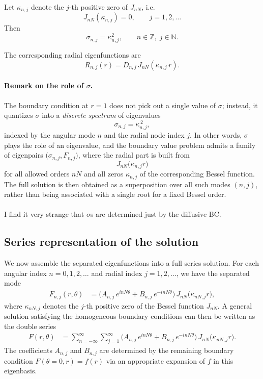 \documentclass{article}
\begin{document}
Let \(\kappa_{n,j}\) denote the \(j\)-th positive zero of \(J_{nN}\), i.e.
\[
J_{nN}(\kappa_{n,j}) = 0,
\qquad j = 1,2,\dots
\]
Then
\begin{equation}
\sigma_{n,j} = \kappa_{n,j}^2,
\qquad n \in \mathbb{Z},\; j \in \mathbb{N}.
\label{eq:eigenvalues}
\end{equation}

The corresponding radial eigenfunctions are
\begin{equation}
R_{n,j}(r)
= D_{n,j}\,J_{nN}\!\left(\kappa_{n,j}\,r\right).
\label{eq:final-radial-modes}
\end{equation}



\paragraph{Remark on the role of \(\sigma\).}
The boundary condition at \(r=1\) does not pick out a single value of \(\sigma\); instead, it quantizes \(\sigma\) into a \emph{discrete spectrum} of eigenvalues
\[
\sigma_{n,j} = \kappa_{n,j}^{\,2},
\]
indexed by the angular mode \(n\) and the radial node index \(j\). In other words, \(\sigma\) plays the role of an eigenvalue, and the boundary value problem admits a family of eigenpairs \(\bigl(\sigma_{n,j}, F_{n,j}\bigr)\), where the radial part is built from
\[
J_{nN}\bigl(\kappa_{n,j} r\bigr)
\]
for all allowed orders \(nN\) and all zeros \(\kappa_{n,j}\) of the corresponding Bessel function. The full solution is then obtained as a superposition over all such modes \((n,j)\), rather than being associated with a single root for a fixed Bessel order.
\\
\\
\color{blue}
I find it very strange that $\sigma$s are determined just by the diffusive BC.  
\color{black}

\subsection*{Series representation of the solution}

We now assemble the separated eigenfunctions into a full series solution. For each angular index 
\(n = 0,1,2,\dots\) and radial index \(j = 1,2,\dots\), we have the separated mode
\begin{align}
F_{n,j}(r,\theta)
&=
\bigl(
A_{n,j} \, e^{i nN\theta}
+
B_{n,j} \, e^{-i nN\theta}
\bigr)\,
J_{nN}\bigl(\kappa_{nN,j} r\bigr), \tag{15)}
\end{align}
where \(\kappa_{nN,j}\) denotes the \(j\)-th positive zero of the Bessel function \(J_{nN}\). A general solution
satisfying the homogeneous boundary conditions can then be written as the double series
\begin{align}
F(r,\theta)
&=
\sum_{n=-\infty}^{\infty}
\sum_{j=1}^{\infty}
\bigl(
A_{n,j} \, e^{i nN\theta}
+
B_{n,j} \, e^{-i nN\theta}
\bigr)\,
J_{nN}\bigl(\kappa_{nN,j} r\bigr). \tag{16)}
\end{align}
The coefficients \(A_{n,j}\) and \(B_{n,j}\) are determined by the remaining boundary condition
\(F(\theta=0,r) = f(r)\) via an appropriate expansion of \(f\) in this eigenbasis.
\end{document}
